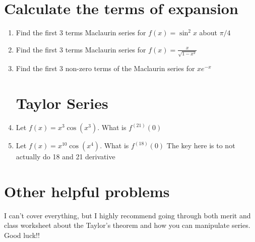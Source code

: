 \section{Calculate the terms of expansion}
\begin{enumerate}
	\item Find the first 3 terms Maclaurin series for $f(x)= \sin^2 x$ about $\pi/4$

	\vfill

	\item Find the first 3 terms Maclaurin series for $f(x)=\frac{x}{\sqrt{1-x^2}}$

	\vfill

	\item Find the first 3 non-zero terms of the Maclaurin series for $xe^{- x}$
	\vfill
\section{Taylor Series}
	\item Let $f(x)=x^3\cos(x^3)$. What is $f^{(21)}(0)$
	\vfill 
	\item Let $f(x)=x^{10}\cos(x^4)$. What is $f^{(18)}(0)$
	The key here is to not actually do 18 and 21 derivative
	\vfill

\end{enumerate}
\section{Other helpful problems}

I can't cover everything, but I highly recommend going through both merit and class worksheet about the Taylor's theorem and how you can manipulate series. Good luck!!
